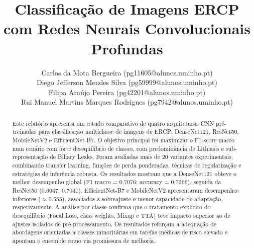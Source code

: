 \documentclass[runningheads]{llncs}
\begin{document}
%
\title{Classificação de Imagens ERCP com Redes Neurais Convolucionais Profundas}
%
%
\author{
Carlos da Mota Bergueira (pg11605@alunos.uminho.pt) \\
Diego Jefferson Mendes Silva (pg59999@alunos.uminho.pt) \\
Filipa Araújo Pereira (pg42201@alunos.uminho.pt) \\
Rui Manuel Martins Marques Rodrigues (pg7942@alunos.uminho.pt)
}
%
%
%
\maketitle              %
%
\begin{abstract}
Este relatório apresenta um estudo comparativo de quatro arquiteturas CNN
pré-treinadas para classificação multiclasse de imagens de ERCP:
DenseNet121, ResNet50, MobileNetV2 e EfficientNet-B7. O objetivo principal
foi maximizar o F1-score macro num cenário com forte desequilíbrio de
classes, com predominância de Lithiasis e sub-representação de Biliary Leaks.
Foram avaliadas mais de 20 variantes experimentais, combinando transfer
learning, funções de perda ponderadas, técnicas de regularização e estratégias
de inferência robusta. Os resultados mostram que a DenseNet121 obteve o
melhor desempenho global (F1 macro = 0.7076; accuracy = 0.7266), seguida da
ResNet50 (0.6647; 0.7041). EfficientNet-B7 e MobileNetV2 apresentaram
desempenhos inferiores (\(\approx\)0.555), associados a sobreajuste e menor
capacidade de adaptação, respetivamente. A análise por classe confirma que o
tratamento explícito do desequilíbrio (Focal Loss, class weights, Mixup e TTA)
teve impacto superior ao de ajustes isolados de pré-processamento. Os
resultados reforçam a adequação de abordagens orientadas a classes minoritárias
em tarefas médicas de risco elevado e apontam o ensemble como via promissora
de melhoria.

\end{abstract}
%
\end{document}
